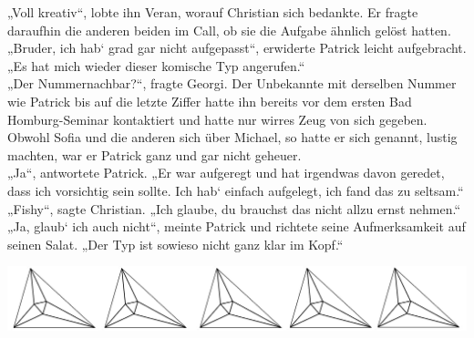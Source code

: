 \documentclass[oneside]{memoir}
\newcommand{\parasep}{
\bigskip
\bigskip
\begin{center} 
   \includegraphics[scale=.08]{parasep5.jpg} 
\end{center}
\bigskip
\bigskip
}
\begin{document}
„Voll kreativ“, lobte ihn Veran, worauf Christian sich bedankte. Er fragte daraufhin die anderen beiden im Call, ob sie die Aufgabe ähnlich gelöst hatten. \\
„Bruder, ich hab‘ grad gar nicht aufgepasst“, erwiderte Patrick leicht aufgebracht. „Es hat mich wieder dieser komische Typ angerufen.“ \\
„Der Nummernachbar?“, fragte Georgi. Der Unbekannte mit derselben Nummer wie Patrick bis auf die letzte Ziffer hatte ihn bereits vor dem ersten Bad Homburg-Seminar kontaktiert und hatte nur wirres Zeug von sich gegeben. Obwohl Sofia und die anderen sich über Michael, so hatte er sich genannt, lustig machten, war er Patrick ganz und gar nicht geheuer. \\
„Ja“, antwortete Patrick. „Er war aufgeregt und hat irgendwas davon geredet, dass ich vorsichtig sein sollte. Ich hab‘ einfach aufgelegt, ich fand das zu seltsam.“ \\
„Fishy“, sagte Christian. „Ich glaube, du brauchst das nicht allzu ernst nehmen.“ \\
„Ja, glaub‘ ich auch nicht“, meinte Patrick und richtete seine Aufmerksamkeit auf seinen Salat. „Der Typ ist sowieso nicht ganz klar im Kopf.“

\parasep
\end{document}
